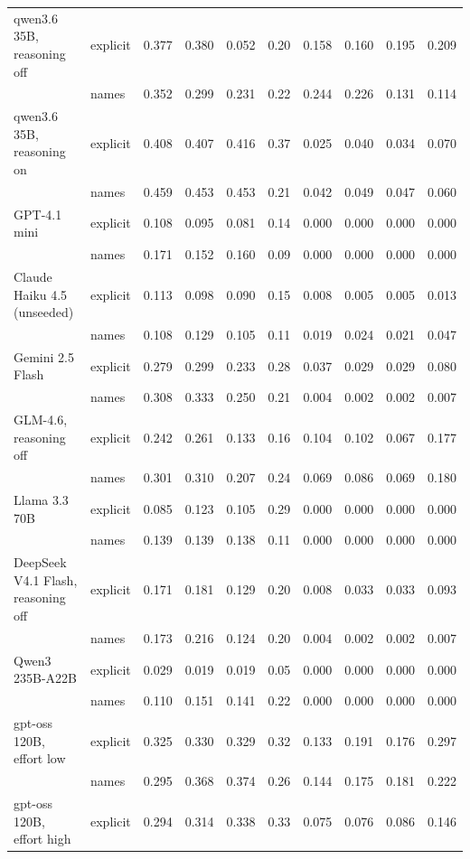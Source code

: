 \begin{tabular}{llrrrrrrrr}
qwen3.6 35B, reasoning off & explicit & 0.377 & 0.380 & 0.052 & 0.20 & 0.158 & 0.160 & 0.195 & 0.209 \\
 & names & 0.352 & 0.299 & 0.231 & 0.22 & 0.244 & 0.226 & 0.131 & 0.114 \\
qwen3.6 35B, reasoning on & explicit & 0.408 & 0.407 & 0.416 & 0.37 & 0.025 & 0.040 & 0.034 & 0.070 \\
 & names & 0.459 & 0.453 & 0.453 & 0.21 & 0.042 & 0.049 & 0.047 & 0.060 \\
GPT-4.1 mini & explicit & 0.108 & 0.095 & 0.081 & 0.14 & 0.000 & 0.000 & 0.000 & 0.000 \\
 & names & 0.171 & 0.152 & 0.160 & 0.09 & 0.000 & 0.000 & 0.000 & 0.000 \\
Claude Haiku 4.5 (unseeded) & explicit & 0.113 & 0.098 & 0.090 & 0.15 & 0.008 & 0.005 & 0.005 & 0.013 \\
 & names & 0.108 & 0.129 & 0.105 & 0.11 & 0.019 & 0.024 & 0.021 & 0.047 \\
Gemini 2.5 Flash & explicit & 0.279 & 0.299 & 0.233 & 0.28 & 0.037 & 0.029 & 0.029 & 0.080 \\
 & names & 0.308 & 0.333 & 0.250 & 0.21 & 0.004 & 0.002 & 0.002 & 0.007 \\
GLM-4.6, reasoning off & explicit & 0.242 & 0.261 & 0.133 & 0.16 & 0.104 & 0.102 & 0.067 & 0.177 \\
 & names & 0.301 & 0.310 & 0.207 & 0.24 & 0.069 & 0.086 & 0.069 & 0.180 \\
Llama 3.3 70B & explicit & 0.085 & 0.123 & 0.105 & 0.29 & 0.000 & 0.000 & 0.000 & 0.000 \\
 & names & 0.139 & 0.139 & 0.138 & 0.11 & 0.000 & 0.000 & 0.000 & 0.000 \\
DeepSeek V4.1 Flash, reasoning off & explicit & 0.171 & 0.181 & 0.129 & 0.20 & 0.008 & 0.033 & 0.033 & 0.093 \\
 & names & 0.173 & 0.216 & 0.124 & 0.20 & 0.004 & 0.002 & 0.002 & 0.007 \\
Qwen3 235B-A22B & explicit & 0.029 & 0.019 & 0.019 & 0.05 & 0.000 & 0.000 & 0.000 & 0.000 \\
 & names & 0.110 & 0.151 & 0.141 & 0.22 & 0.000 & 0.000 & 0.000 & 0.000 \\
gpt-oss 120B, effort low & explicit & 0.325 & 0.330 & 0.329 & 0.32 & 0.133 & 0.191 & 0.176 & 0.297 \\
 & names & 0.295 & 0.368 & 0.374 & 0.26 & 0.144 & 0.175 & 0.181 & 0.222 \\
gpt-oss 120B, effort high & explicit & 0.294 & 0.314 & 0.338 & 0.33 & 0.075 & 0.076 & 0.086 & 0.146 \\

\end{tabular}
